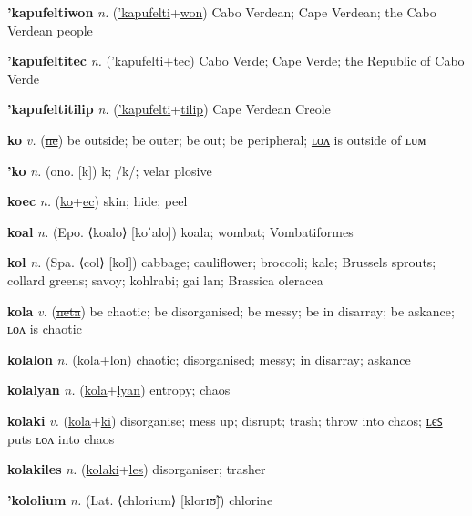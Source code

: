 \textbf{\hypertarget{'kapufeltiwon}{'kapufeltiwon}} \textit{n.} (\hyperlink{'kapufelti}{'kapufelti}+\allowbreak \hyperlink{won}{won})
Cabo Verdean; Cape Verdean; the Cabo Verdean people

\textbf{\hypertarget{'kapufeltitec}{'kapufeltitec}} \textit{n.} (\hyperlink{'kapufelti}{'kapufelti}+\allowbreak \hyperlink{tec}{tec})
Cabo Verde; Cape Verde; the Republic of Cabo Verde

\textbf{\hypertarget{'kapufeltitilip}{'kapufeltitilip}} \textit{n.} (\hyperlink{'kapufelti}{'kapufelti}+\allowbreak \hyperlink{tilip}{tilip})
Cape Verdean Creole

\textbf{\hypertarget{ko}{ko}} \textit{v.} (\hyperlink{ne}{\sout{ne}})
be outside; be outer; be out; be peripheral; \hyperlink{kolon}{ʟᴏᴧ} is outside of ʟᴜᴍ

\textbf{\hypertarget{'ko}{'ko}} \textit{n.} (ono. [k])
k; /k/; velar plosive

\textbf{\hypertarget{koec}{koec}} \textit{n.} (\hyperlink{ko}{ko}+\allowbreak \hyperlink{ec}{ec})
skin; hide; peel

\textbf{\hypertarget{koal}{koal}} \textit{n.} (Epo. ⟨koalo⟩ [koˈalo])
koala; wombat; Vombatiformes

\textbf{\hypertarget{kol}{kol}} \textit{n.} (Spa. ⟨col⟩ [kol])
cabbage; cauliflower; broccoli; kale; Brussels sprouts; collard greens; savoy; kohlrabi; gai lan; Brassica oleracea

\textbf{\hypertarget{kola}{kola}} \textit{v.} (\hyperlink{neta}{\sout{neta}})
be chaotic; be disorganised; be messy; be in disarray; be askance; \hyperlink{kolalon}{ʟᴏᴧ} is chaotic

\textbf{\hypertarget{kolalon}{kolalon}} \textit{n.} (\hyperlink{kola}{kola}+\allowbreak \hyperlink{lon}{lon})
chaotic; disorganised; messy; in disarray; askance

\textbf{\hypertarget{kolalyan}{kolalyan}} \textit{n.} (\hyperlink{kola}{kola}+\allowbreak \hyperlink{lyan}{lyan})
entropy; chaos

\textbf{\hypertarget{kolaki}{kolaki}} \textit{v.} (\hyperlink{kola}{kola}+\allowbreak \hyperlink{ki}{ki})
disorganise; mess up; disrupt; trash; throw into chaos; \hyperlink{kolakiles}{ʟєꜱ} puts ʟᴏᴧ into chaos

\textbf{\hypertarget{kolakiles}{kolakiles}} \textit{n.} (\hyperlink{kolaki}{kolaki}+\allowbreak \hyperlink{les}{les})
disorganiser; trasher

\textbf{\hypertarget{'kololium}{'kololium}} \textit{n.} (Lat. ⟨chlorium⟩ [klorɪʊ̃])
chlorine

